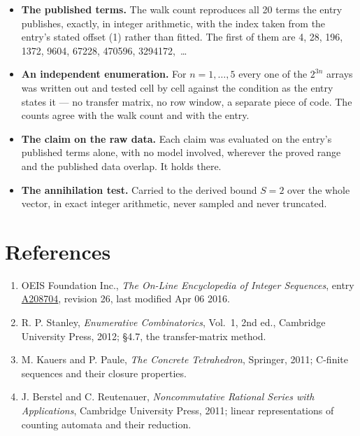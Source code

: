 \documentclass[11pt]{article}
\theoremstyle{definition}
\begin{document}
\begin{itemize}

\item {\bfseries The published terms.} The walk count reproduces all 20 terms the entry publishes, exactly, in integer arithmetic, with the index taken from the entry's stated offset (1) rather than fitted. The first of them are 4, 28, 196, 1372, 9604, 67228, 470596, 3294172,~\dots

\item {\bfseries An independent enumeration.} For $n = 1,\dots,5$ every one of the $2^{3n}$ arrays was written out and tested cell by cell against the condition as the entry states it --- no transfer matrix, no row window, a separate piece of code. The counts agree with the walk count and with the entry.

\item {\bfseries The claim on the raw data.} Each claim was evaluated on the entry's published terms alone, with no model involved, wherever the proved range and the published data overlap. It holds there.

\item {\bfseries The annihilation test.} Carried to the derived bound $S = 2$ over the whole vector, in exact integer arithmetic, never sampled and never truncated.

\end{itemize}

\section{References}

\begin{enumerate}

\item OEIS Foundation Inc., \emph{The On-Line Encyclopedia of Integer Sequences}, entry \href{https://oeis.org/A208704}{A208704}, revision 26, last modified Apr 06 2016.

\item R. P. Stanley, \emph{Enumerative Combinatorics}, Vol.~1, 2nd ed., Cambridge University Press, 2012; \S4.7, the transfer-matrix method.

\item M. Kauers and P. Paule, \emph{The Concrete Tetrahedron}, Springer, 2011; C-finite sequences and their closure properties.

\item J. Berstel and C. Reutenauer, \emph{Noncommutative Rational Series with Applications}, Cambridge University Press, 2011; linear representations of counting automata and their reduction.

\end{enumerate}
\end{document}
